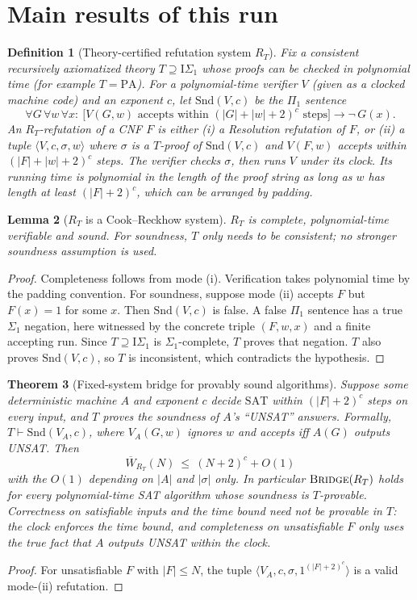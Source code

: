 \documentclass[11pt]{article}
\newtheorem{theorem}{Theorem}
\newtheorem{lemma}[theorem]{Lemma}
\newtheorem{definition}[theorem]{Definition}
\newcommand{\SAT}{\mathrm{SAT}}
\newcommand{\Wbar}{\overline W}
\newcommand{\Snd}{\mathrm{Snd}}
\begin{document}
\section{Main results of this run}

\begin{definition}[Theory-certified refutation system $R_T$]
Fix a consistent recursively axiomatized theory $T\supseteq\mathrm{I}\Sigma_1$
whose proofs can be checked in polynomial time (for example $T=\mathrm{PA}$).
For a polynomial-time verifier $V$ (given as a clocked machine code) and an
exponent $c$, let $\Snd(V,c)$ be the $\Pi_1$ sentence
\[
\forall G\,\forall w\,\forall x:\
\bigl[V(G,w)\text{ accepts within }(|G|+|w|+2)^c\text{ steps}\bigr]
\rightarrow \neg\,G(x).
\]
An $R_T$-refutation of a CNF $F$ is either
(i) a Resolution refutation of $F$, or
(ii) a tuple $\langle V,c,\sigma,w\rangle$ where $\sigma$ is a $T$-proof of
$\Snd(V,c)$ and $V(F,w)$ accepts within $(|F|+|w|+2)^c$ steps.
The verifier checks $\sigma$, then runs $V$ under its clock. Its running time
is polynomial in the length of the proof string as long as $w$ has length at
least $(|F|+2)^c$, which can be arranged by padding.
\end{definition}

\begin{lemma}[$R_T$ is a Cook--Reckhow system]\label{lem:CR}
$R_T$ is complete, polynomial-time verifiable and sound. For soundness,
$T$ only needs to be consistent; no stronger soundness assumption is used.
\end{lemma}
\begin{proof}
Completeness follows from mode (i). Verification takes polynomial time by the
padding convention. For soundness, suppose mode (ii) accepts $F$ but $F(x)=1$
for some $x$. Then $\Snd(V,c)$ is false. A false $\Pi_1$ sentence has a true
$\Sigma_1$ negation, here witnessed by the concrete triple $(F,w,x)$ and a
finite accepting run. Since $T\supseteq\mathrm{I}\Sigma_1$ is $\Sigma_1$-complete,
$T$ proves that negation. $T$ also proves $\Snd(V,c)$, so $T$ is inconsistent,
which contradicts the hypothesis.
\end{proof}

\begin{theorem}[Fixed-system bridge for provably sound algorithms]\label{thm:fixedR}
Suppose some deterministic machine $A$ and exponent $c$ decide $\SAT$ within
$(|F|+2)^c$ steps on every input, and $T$ proves the soundness of $A$'s
``UNSAT'' answers. Formally, $T\vdash\Snd(V_A,c)$, where $V_A(G,w)$ ignores $w$
and accepts iff $A(G)$ outputs UNSAT. Then
\[
\Wbar_{R_T}(N)\ \le\ (N+2)^c+O(1)
\]
with the $O(1)$ depending on $|A|$ and $|\sigma|$ only. In particular
$\textsc{Bridge}(R_T)$ holds for every polynomial-time SAT algorithm whose
soundness is $T$-provable. Correctness on satisfiable inputs and the time bound
need \emph{not} be provable in $T$: the clock enforces the time bound, and
completeness on unsatisfiable $F$ only uses the true fact that $A$ outputs
UNSAT within the clock.
\end{theorem}
\begin{proof}
For unsatisfiable $F$ with $|F|\le N$, the tuple
$\langle V_A,c,\sigma,1^{(|F|+2)^c}\rangle$ is a valid mode-(ii) refutation.
\end{proof}
\end{document}
